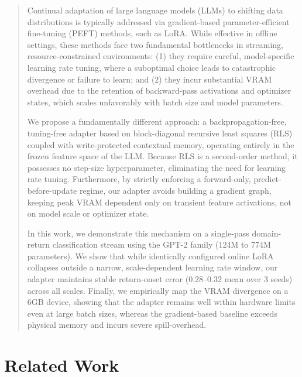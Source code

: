 \documentclass[11pt]{article}
\begin{document}
\begin{quote}
Continual adaptation of large language models (LLMs) to shifting data distributions is typically addressed via gradient-based parameter-efficient fine-tuning (PEFT) methods, such as LoRA. While effective in offline settings, these methods face two fundamental bottlenecks in streaming, resource-constrained environments: (1) they require careful, model-specific learning rate tuning, where a suboptimal choice leads to catastrophic divergence or failure to learn; and (2) they incur substantial VRAM overhead due to the retention of backward-pass activations and optimizer states, which scales unfavorably with batch size and model parameters.

We propose a fundamentally different approach: a backpropagation-free, tuning-free adapter based on block-diagonal recursive least squares (RLS) coupled with write-protected contextual memory, operating entirely in the frozen feature space of the LLM. Because RLS is a second-order method, it possesses no step-size hyperparameter, eliminating the need for learning rate tuning. Furthermore, by strictly enforcing a forward-only, predict-before-update regime, our adapter avoids building a gradient graph, keeping peak VRAM dependent only on transient feature activations, not on model scale or optimizer state.

In this work, we demonstrate this mechanism on a single-pass domain-return classification stream using the GPT-2 family (124M to 774M parameters). We show that while identically configured online LoRA collapses outside a narrow, scale-dependent learning rate window, our adapter maintains stable return-onset error (0.28--0.32 mean over 3 seeds) across all scales. Finally, we empirically map the VRAM divergence on a 6GB device, showing that the adapter remains well within hardware limits even at large batch sizes, whereas the gradient-based baseline exceeds physical memory and incurs severe spill-overhead.
\end{quote}

\section{Related Work}\label{related-work}
\end{document}
